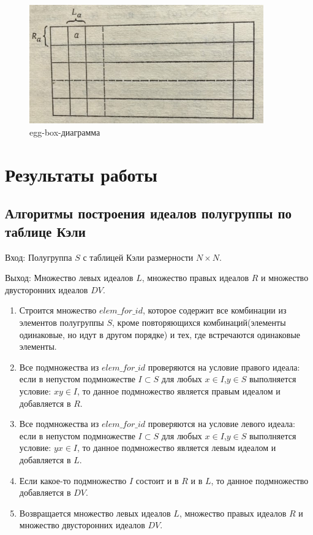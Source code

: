 \documentclass[bachelor, och, labwork]{shiza}
\begin{document}
	\begin{figure}[H]
		\centering
		\includegraphics[width=0.9\textwidth]{egg_box}
		\caption{egg-box-диаграмма}
		\label{fig:egg_box}
	\end{figure}

	\section{Результаты работы}
	
	\subsection{Алгоритмы построения идеалов полугруппы по таблице Кэли}
	
	$\textit{Вход:}$ Полугруппа $S$ с таблицей Кэли размерности $N \times N$.

	$\textit{Выход:}$  Множество левых идеалов $L$, множество правых идеалов $R$ и множество двусторонних идеалов $DV$.

	\begin{enumerate} 
		\item Строится множество $elem\_for\_id$, которое содержит все комбинации из элементов полугруппы $S$, кроме повторяющихся комбинаций(элементы одинаковые, но идут в другом порядке) и тех, где встречаются одинаковые элементы.

		\item Все подмножества из $elem\_for\_id$ проверяются на условие правого идеала: если в непустом подмножестве $I \subset  S$ для любых $x \in I$,$y \in S$ выполняется условие: $xy \in I$, то данное подмножество является правым идеалом и добавляется в $R$.
		
		\item Все подмножества из $elem\_for\_id$ проверяются на условие левого идеала: если в непустом подмножестве $I \subset  S$ для любых $x \in I$,$y \in S$ выполняется условие: $yx \in I$, то данное подмножество является левым идеалом и добавляется в $L$.
		
		\item Если какое-то подмножество $I$ состоит и в $R$ и в $L$, то данное подмножество добавляется в $DV$.
		\item Возвращается множество левых идеалов $L$, множество правых идеалов $R$ и множество двусторонних идеалов $DV$.
	\end{enumerate} 
	
\end{document}
